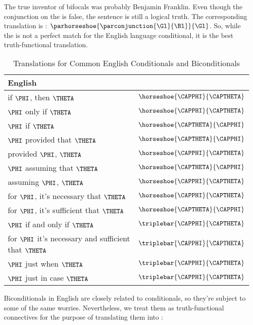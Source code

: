 \noindent{}The true inventor of bifocals was probably Benjamin Franklin.
Even though the conjunction on the  is false, the sentence is still a logical truth.
The corresponding \GSL{} translation is : $\parhorseshoe{\parconjunction{\Gl}{\Bl}}{\Gl}$.
So, while the \mention{$\HORSESHOE$} is not a perfect match for the English language conditional, it is the best truth-functional translation.

\begin{table}
	\renewcommand{\arraystretch}{1.5}%
	\begin{center}
		\begin{tabular}{ l l } %
			\toprule
			\textbf{English} & \textbf{\GSL{}} \\ 
			\midrule
			if $\PHI$, then $\THETA$ & $\horseshoe{\CAPPHI}{\CAPTHETA}$ \\
			$\PHI$ only if $\THETA$ & $\horseshoe{\CAPPHI}{\CAPTHETA}$ \\
			$\PHI$ if $\THETA$ & $\horseshoe{\CAPTHETA}{\CAPPHI}$ \\
			$\PHI$ provided that $\THETA$ & $\horseshoe{\CAPTHETA}{\CAPPHI}$ \\
			provided $\PHI$, $\THETA$ & $\horseshoe{\CAPPHI}{\CAPTHETA}$ \\
			$\PHI$ assuming that $\THETA$ & $\horseshoe{\CAPTHETA}{\CAPPHI}$ \\
			assuming $\PHI$, $\THETA$ & $\horseshoe{\CAPPHI}{\CAPTHETA}$ \\
			for $\PHI$, it's necessary that $\THETA$ & $\horseshoe{\CAPPHI}{\CAPTHETA}$ \\
			for $\PHI$, it's sufficient that $\THETA$ & $\horseshoe{\CAPTHETA}{\CAPPHI}$ \\
			$\PHI$ if and only if $\THETA$ & $\triplebar{\CAPPHI}{\CAPTHETA}$ \\
			for $\PHI$ it's necessary and sufficient that $\THETA$ & $\triplebar{\CAPPHI}{\CAPTHETA}$ \\
			$\PHI$ just when $\THETA$ & $\triplebar{\CAPPHI}{\CAPTHETA}$ \\
			$\PHI$ just in case $\THETA$ & $\triplebar{\CAPPHI}{\CAPTHETA}$ \\
			\bottomrule
		\end{tabular}%
		\caption{Translations for Common English Conditionals and Biconditionals}
		\label{TransTableA}
	\end{center}
\end{table}

Biconditionals in English are closely related to conditionals, so they're subject to some of the same worries.
Nevertheless, we treat them as truth-functional connectives for the purpose of translating them into \GSL{}:

